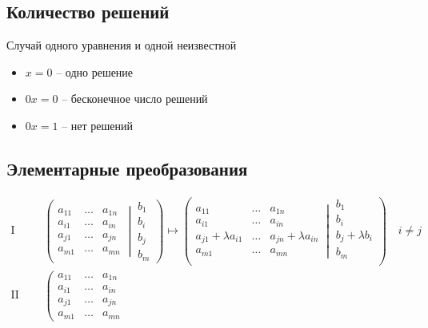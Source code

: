 \documentclass{article}
\begin{document}
\subsection*{Количество решений}
Случай одного уравнения и одной неизвестной
\begin{itemize}
	\item $x = 0$ -- одно решение
	\item $0x = 0$ -- бесконечное число решений
	\item $0x = 1$ -- нет решений
\end{itemize}


\subsection*{Элементарные преобразования}
\begin{align*}
	\text{I тип: }&
	\left(\left.
	\begin{matrix}
		a_{11}&\ldots&a_{1n}\\
		a_{i1}&\ldots&a_{in}\\
		a_{j1}&\ldots&a_{jn}\\
		a_{m1}&\ldots&a_{mn}
	\end{matrix}
	\:\right|\:
	\begin{matrix}
		b_1\\
		b_i\\
		b_j\\
		b_m
	\end{matrix}
	\right)
	\mapsto
	\left(\left.
	\begin{matrix}
		a_{11}&\ldots&a_{1n}\\
		a_{i1}&\ldots&a_{in}\\
		a_{j1} + \lambda a_{i1}&\ldots&a_{jn}+ \lambda a_{in}\\
		a_{m1}&\ldots&a_{mn}
	\end{matrix}
	\:\right|\:
	\begin{matrix}
		b_1\\
		b_i\\
		b_j+ \lambda b_i\\
		b_m\\
	\end{matrix}
	\right)
	\quad i\neq j
	\\
	\text{II тип: }&
	\left(\left.
	\begin{matrix}
		a_{11}&\ldots&a_{1n}\\
		a_{i1}&\ldots&a_{in}\\
		a_{j1}&\ldots&a_{jn}\\
		a_{m1}&\ldots&a_{mn}

\end{matrix}
\end{align*}
\end{document}
